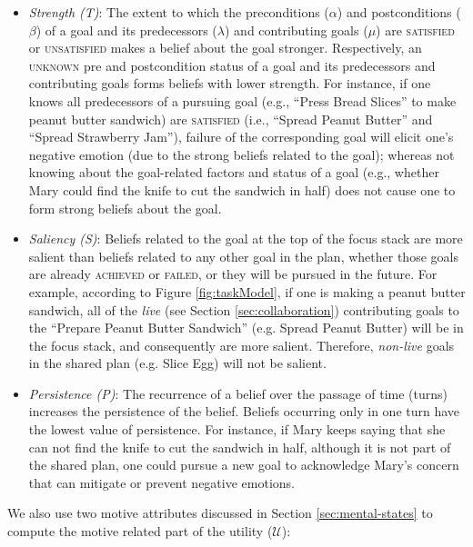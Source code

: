 \documentclass{article}
\begin{document}
\vspace*{-1mm}
\begin{itemize}[leftmargin=2pt]
  \setlength\itemsep{0.2mm}
  \item \textit{Strength (T)}: The extent to which the preconditions ($\alpha$)
  and postconditions ($\beta$) of a goal and its predecessors ($\lambda$) and
  contributing goals ($\mu$) are \textsc{satisfied} or \textsc{unsatisfied}
  makes a belief about the goal stronger. Respectively, an \textsc{unknown}
  pre and postcondition status of a goal and its predecessors and contributing
  goals forms beliefs with lower strength. For instance, if one knows all
  predecessors of a pursuing goal (e.g., ``Press Bread Slices'' to make peanut
  butter sandwich) are \textsc{satisfied} (i.e., ``Spread Peanut Butter'' and
  ``Spread Strawberry Jam''), failure of the corresponding goal will elicit
  one's negative emotion (due to the strong beliefs related to the goal);
  whereas not knowing about the goal-related factors and status of a goal
  (e.g., whether Mary could find the knife to cut the sandwich in half) does not
  cause one to form strong beliefs about the goal.
  \item \textit{Saliency (S)}: Beliefs related to the goal at the top of the
  focus stack are more salient than beliefs related to any other goal in the
  plan, whether those goals are already \textsc{achieved} or \textsc{failed}, or
  they will be pursued in the future. For example, according to Figure
  \ref{fig:taskModel}, if one is making a peanut butter sandwich, all of the
  \textit{live} (see Section \ref{sec:collaboration}) contributing goals to the
  ``Prepare Peanut Butter Sandwich'' (e.g. Spread Peanut Butter) will be in
  the focus stack, and consequently are more salient. Therefore,
  \textit{non-live} goals in the shared plan (e.g. Slice Egg) will not be
  salient.
  \item \textit{Persistence (P)}: The recurrence of a belief over the passage
  of time (turns) increases the persistence of the belief. Beliefs occurring
  only in one turn have the lowest value of persistence. For instance, if Mary
  keeps saying that she can not find the knife to cut the sandwich in half,
  although it is not part of the shared plan, one could pursue a new goal to
  acknowledge Mary's concern that can mitigate or prevent negative emotions.
\end{itemize}

\noindent We also use two motive attributes discussed in Section
\ref{sec:mental-states} to compute the motive related part of the utility
($\mathcal{U}$):
\end{document}
